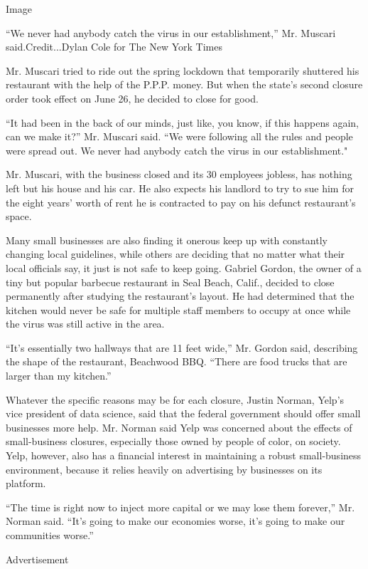 Image

``We never had anybody catch the virus in our establishment,'' Mr.
Muscari said.Credit...Dylan Cole for The New York Times

Mr. Muscari tried to ride out the spring lockdown that temporarily
shuttered his restaurant with the help of the P.P.P. money. But when the
state's second closure order took effect on June 26, he decided to close
for good.

``It had been in the back of our minds, just like, you know, if this
happens again, can we make it?'' Mr. Muscari said. ``We were following
all the rules and people were spread out. We never had anybody catch the
virus in our establishment."

Mr. Muscari, with the business closed and its 30 employees jobless, has
nothing left but his house and his car. He also expects his landlord to
try to sue him for the eight years' worth of rent he is contracted to
pay on his defunct restaurant's space.

Many small businesses are also finding it onerous keep up with
constantly changing local guidelines, while others are deciding that no
matter what their local officials say, it just is not safe to keep
going. Gabriel Gordon, the owner of a tiny but popular barbecue
restaurant in Seal Beach, Calif., decided to close permanently after
studying the restaurant's layout. He had determined that the kitchen
would never be safe for multiple staff members to occupy at once while
the virus was still active in the area.

``It's essentially two hallways that are 11 feet wide,'' Mr. Gordon
said, describing the shape of the restaurant, Beachwood BBQ. ``There are
food trucks that are larger than my kitchen.''

Whatever the specific reasons may be for each closure, Justin Norman,
Yelp's vice president of data science, said that the federal government
should offer small businesses more help. Mr. Norman said Yelp was
concerned about the effects of small-business closures, especially those
owned by people of color, on society. Yelp, however, also has a
financial interest in maintaining a robust small-business environment,
because it relies heavily on advertising by businesses on its platform.

``The time is right now to inject more capital or we may lose them
forever,'' Mr. Norman said. ``It's going to make our economies worse,
it's going to make our communities worse.''

Advertisement

